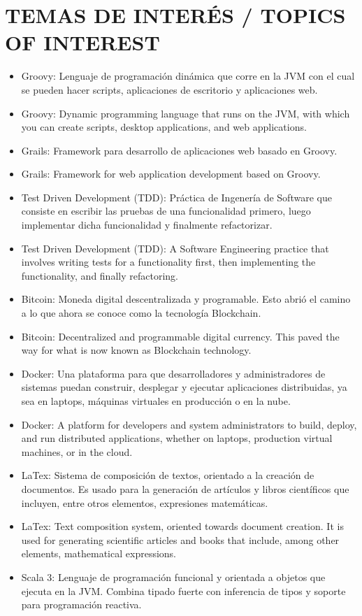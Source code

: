 \documentclass[paper=a4,fontsize=11pt]{scrartcl} %
\newcommand{\NewPart}[1]{\section*{\uppercase{#1}}}
\begin{document}
\NewPart{Temas de Interés / Topics of Interest}{}{}{
\begin{itemize}
\item{Groovy: Lenguaje de programación dinámica que corre en la JVM con el cual se pueden hacer scripts, aplicaciones de escritorio y aplicaciones web.}
\item{Groovy: Dynamic programming language that runs on the JVM, with which you can create scripts, desktop applications, and web applications.}
\item{Grails: Framework para desarrollo de aplicaciones web basado en Groovy.}
\item{Grails: Framework for web application development based on Groovy.}
\item{Test Driven Development (TDD): Práctica de Ingenería de Software que consiste en escribir las pruebas de una funcionalidad primero, luego implementar dicha funcionalidad y finalmente refactorizar.}
\item{Test Driven Development (TDD): A Software Engineering practice that involves writing tests for a functionality first, then implementing the functionality, and finally refactoring.}
\item{Bitcoin: Moneda digital descentralizada y programable. Esto abrió el camino a lo que ahora se conoce como la tecnología Blockchain.}
\item{Bitcoin: Decentralized and programmable digital currency. This paved the way for what is now known as Blockchain technology.}
\item{Docker: Una plataforma para que desarrolladores y administradores de sistemas puedan construir, desplegar y ejecutar aplicaciones distribuidas, ya sea en laptops, máquinas virtuales en producción o en la nube.}
\item{Docker: A platform for developers and system administrators to build, deploy, and run distributed applications, whether on laptops, production virtual machines, or in the cloud.}
\item{LaTex: Sistema de composición de textos, orientado a la creación de documentos. Es usado para la generación de artículos y libros científicos que incluyen, entre otros elementos, expresiones matemáticas.}
\item{LaTex: Text composition system, oriented towards document creation. It is used for generating scientific articles and books that include, among other elements, mathematical expressions.}
\item{Scala 3: Lenguaje de programación funcional y orientada a objetos que ejecuta en la JVM. Combina tipado fuerte con inferencia de tipos y soporte para programación reactiva.}

\end{itemize}}
\end{document}

